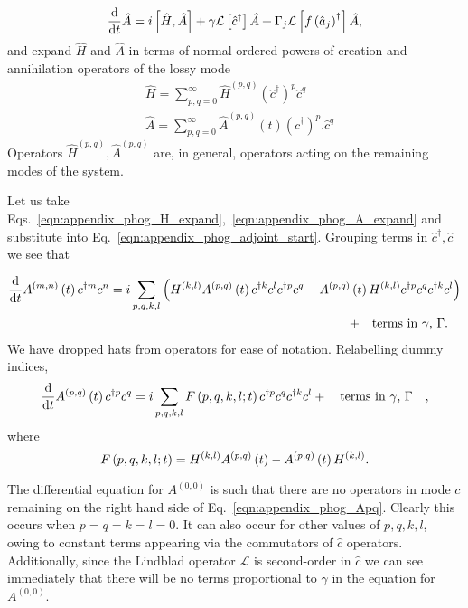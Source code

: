 \begin{equation}\label{eqn:appendix_phog_adjoint_start}
\frac{\mathrm{d}}{\mathrm{d}t} \hat{A} = i \left[ \hat{H}, \hat{A} \right] + \gamma \mathcal{L}\left[\hat{c}^\dagger \right] \hat{A} + \Gamma_j \mathcal{L} \left[ f\left(\hat{a}_j\right)^\dagger\right] \hat{A},
\end{equation}
and expand $\hat{H}$ and $\hat{A}$ in terms of normal-ordered powers of creation and annihilation operators of the lossy mode
\begin{align}
&\hat{H} = \sum_{p, q = 0}^{\infty} \hat{H}^{\left(p, q\right)} \left(\hat{c}^\dagger\right)^p \hat{c}^q \label{eqn:appendix_phog_H_expand}  \\
%
&\hat{A} = \sum_{p, q = 0}^{\infty} \hat{A}^{\left(p, q\right)}\left(t\right) \left(\hat{c}^\dagger \right)^p. \hat{c}^q \label{eqn:appendix_phog_A_expand}
\end{align}
Operators $\hat{H}^{\left(p, q\right)}, \hat{A}^{\left(p, q\right)}$ are, in general, operators acting on the remaining modes of the system.

Let us take Eqs.~\ref{eqn:appendix_phog_H_expand},~\ref{eqn:appendix_phog_A_expand} and substitute into Eq.~\ref{eqn:appendix_phog_adjoint_start}. Grouping terms in $\hat{c}^\dagger, \hat{c}$ we see that 

\begin{align}
\ddt A^{\left(m, n\right)}\left(t\right) c^{\dagger m} c^n = i \sum_{p, q, k, l} \left(H^{\left(k, l\right)} A^{\left(p, q\right)}\left(t\right) c^{\dagger k} c^{l} c^{\dagger p} c^q - A^{\left(p, q\right)}\left(t\right) H^{\left(k, l\right)} c^{\dagger p} c^q c^{\dagger k} c^l\right)& \notag \\
%
+ \qq{terms in $\gamma$, $\Gamma$.}&
\end{align}
We have dropped hats from operators for ease of notation. Relabelling dummy indices,
\begin{equation}\label{eqn:appendix_phog_Apq}
\ddt A^{\left(p, q\right)}\left(t\right) c^{\dagger p} c^q = i \sum_{p, q, k, l} F\left(p, q, k, l; t\right) c^{\dagger p} c^{q} c^{\dagger k} c^l + \qq{terms in $\gamma$, $\Gamma$},
\end{equation}
where
\begin{equation}
F\left(p, q, k, l; t\right) = H^{\left(k, l\right)} A^{\left(p, q\right)}\left(t\right) - A^{\left(p, q\right)}\left(t\right) H^{\left(k, l\right)}. \notag
\end{equation}

\noindent The differential equation for $A^{\left(0, 0\right)}$ is such that there are no operators in mode $c$ remaining on the right hand side of Eq.~\ref{eqn:appendix_phog_Apq}. Clearly this occurs when $p=q=k=l=0$. It can also occur for other values of $p, q, k, l$, owing to constant terms appearing via the commutators of $\hat{c}$ operators. Additionally, since the Lindblad operator $\mathcal{L}$ is second-order in $\hat{c}$ we can see immediately that there will be no terms proportional to $\gamma$ in the equation for $A^{\left(0, 0\right)}$. 

